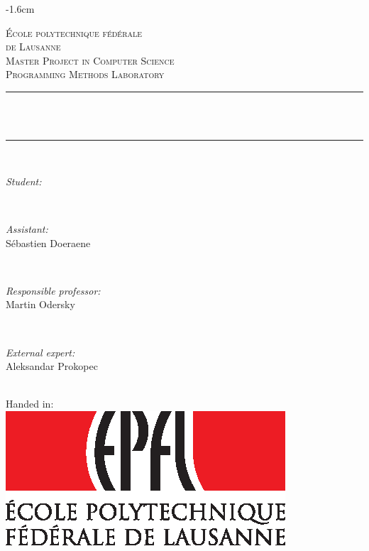 \thispagestyle{empty}

\begin{adjustwidth*}{}{-1.6cm}

\newcommand{\HRule}{\rule{\linewidth}{0.5mm}}
\newcommand{\person}[2]{
  \begin{minipage}{0.32\textwidth}
    \begin{flushleft} \large
      \emph{#1:}\\
      #2
    \end{flushleft}
  \end{minipage}
  \\[0.7cm]
}

\center
 
\textsc{\LARGE École polytechnique fédérale\\de Lausanne}\\[1cm]
\textsc{\Large Master Project in Computer Science}\\[0.2cm]
\textsc{\large Programming Methods Laboratory }\\[0.7cm]

\HRule \\[0.5cm]
{\huge \bfseries \thetitle}\\[0.2cm]
\HRule \\[1.7cm]

\person{Student}{\theauthor}
\person{Assistant}{Sébastien Doeraene}
\person{Responsible professor}{Martin Odersky}
\person{External expert}{Aleksandar Prokopec}

\vspace{1cm}
{\large Handed in: \thedate}
\\[1.15cm]

\includegraphics{epfl.eps}

\vfill

\end{adjustwidth*}

\newpage\thispagestyle{empty}\null\newpage
